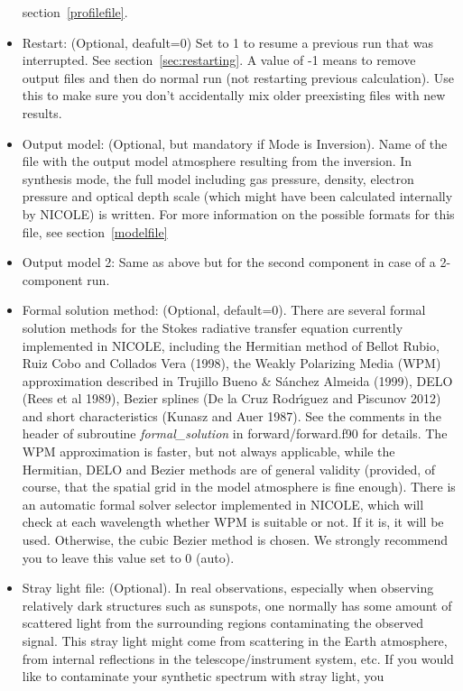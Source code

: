 \begin{itemize}
  section~\ref{profilefile}.
\item Restart: (Optional, deafult=0) Set to 1 to resume a previous run
  that was interrupted. See section~\ref{sec:restarting}. A value of
  -1 means to remove output files and then do normal run (not restarting
  previous calculation). Use this to make sure you don't accidentally mix
  older preexisting files with new results.
\item Output model: (Optional, but mandatory if Mode is Inversion).
  Name of the file with the output model atmosphere resulting from the
  inversion. In synthesis mode, the full model including gas pressure,
  density, electron pressure and optical depth scale (which might have
  been calculated internally by NICOLE) is written.  For more
  information on the possible formats for this file, see
  section~\ref{modelfile}
\item Output model 2: Same as above but for the second component in
  case of a 2-component run.
\item Formal solution method: (Optional, default=0). There are several
  formal solution methods for the Stokes radiative transfer equation
  currently implemented in NICOLE, including the Hermitian method of
  Bellot Rubio, Ruiz Cobo and Collados Vera (1998), the Weakly
  Polarizing Media (WPM) approximation described in Trujillo Bueno \&
  S\'anchez Almeida (1999), DELO (Rees et al 1989), Bezier splines (De
  la Cruz Rodr\'\i guez and Piscunov 2012) and short characteristics
  (Kunasz and Auer 1987). See the comments in the header of subroutine
  {\em formal\_solution} in forward/forward.f90 for details. The WPM
  approximation is faster, but not always applicable, while the
  Hermitian, DELO and Bezier methods are of general validity
  (provided, of course, that the spatial grid in the model atmosphere
  is fine enough). There is an automatic formal solver selector
  implemented in NICOLE, which will check at each wavelength whether
  WPM is suitable or not. If it is, it will be used. Otherwise, the
  cubic Bezier method is chosen. We strongly recommend you to leave
  this value set to 0 (auto).
\item Stray light file: (Optional). In real observations, especially
  when observing relatively dark structures such as sunspots, one
  normally has some amount of scattered light from the surrounding
  regions contaminating the observed signal. This stray light might
  come from scattering in the Earth atmosphere, from internal
  reflections in the telescope/instrument system, etc. If you would
  like to contaminate your synthetic spectrum with stray light, you

\end{itemize}
